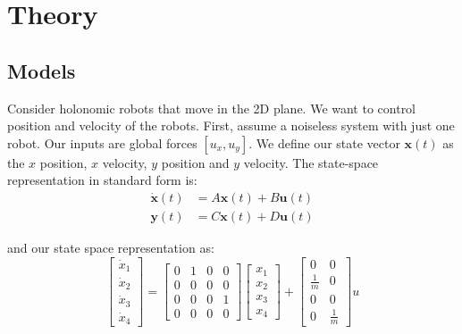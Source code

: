 \section{Theory}
\label{sec:theory}


\subsection{Models}
Consider holonomic robots that move in the 2D plane. We want to control position and velocity of the robots. 
First, assume a noiseless system with just one robot.
 Our inputs are global forces $[u_x,u_y]$. We define our state vector $\mathbf{x}(t)$ as the $x$ position, $x$ velocity, $y$ position and $y$ velocity.
The state-space representation in standard form is: 
\begin{align}\label{eq:stdform}
\dot{\mathbf{x}}(t)  &=  A \mathbf{x}(t) + B \mathbf{u}(t) \\
\mathbf{y}(t) &= C \mathbf{x}(t) + D \mathbf{u}(t)\nonumber 
\end{align}

and our state space representation as:
\begin{equation}
\begin{bmatrix}
\dot{x}_1\\ 
\dot{x}_2\\
\dot{x}_3\\
\dot{x}_4
\end{bmatrix} = \begin{bmatrix}
0 & 1 & 0 & 0 \\
0 & 0 & 0 & 0\\
0 & 0 & 0 & 1\\
0 & 0 & 0 & 0
\end{bmatrix}  \begin{bmatrix}
x_1\\
x_2\\
x_3\\
x_4
\end{bmatrix} + \begin{bmatrix}
0 & 0 \\
\frac{1}{m} & 0 \\
0 & 0 \\
0 & \frac{1}{m}
\end{bmatrix} u
\end{equation}

